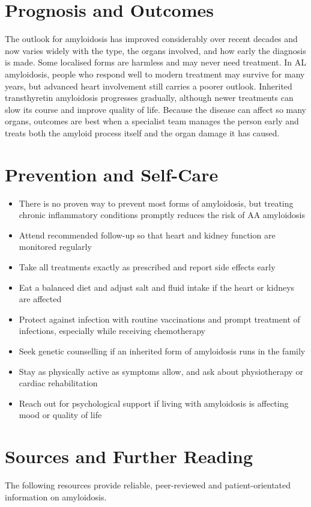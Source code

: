 \section*{Prognosis and Outcomes}
The outlook for amyloidosis has improved considerably over recent decades and now varies widely with the type, the organs involved, and how early the diagnosis is made. Some localised forms are harmless and may never need treatment. In AL amyloidosis, people who respond well to modern treatment may survive for many years, but advanced heart involvement still carries a poorer outlook. Inherited transthyretin amyloidosis progresses gradually, although newer treatments can slow its course and improve quality of life. Because the disease can affect so many organs, outcomes are best when a specialist team manages the person early and treats both the amyloid process itself and the organ damage it has caused.

\section*{Prevention and Self-Care}
\begin{itemize}
    \item There is no proven way to prevent most forms of amyloidosis, but treating chronic inflammatory conditions promptly reduces the risk of AA amyloidosis
    \item Attend recommended follow-up so that heart and kidney function are monitored regularly
    \item Take all treatments exactly as prescribed and report side effects early
    \item Eat a balanced diet and adjust salt and fluid intake if the heart or kidneys are affected
    \item Protect against infection with routine vaccinations and prompt treatment of infections, especially while receiving chemotherapy
    \item Seek genetic counselling if an inherited form of amyloidosis runs in the family
    \item Stay as physically active as symptoms allow, and ask about physiotherapy or cardiac rehabilitation
    \item Reach out for psychological support if living with amyloidosis is affecting mood or quality of life
\end{itemize}

\section*{Sources and Further Reading}
The following resources provide reliable, peer-reviewed and patient-orientated information on amyloidosis.

